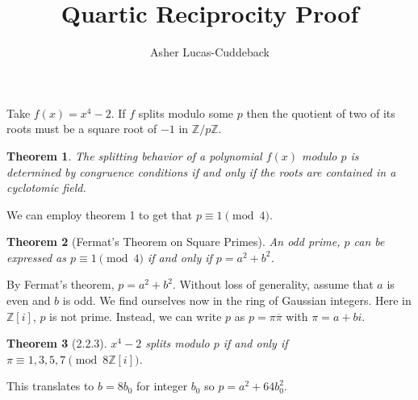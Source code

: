 \documentclass{tufte-handout}
\title{Quartic Reciprocity Proof}
\author[Asher]{Asher Lucas-Cuddeback}
\newtheorem{thm}{Theorem}
\begin{document}
\maketitle%

Take \(f(x)=x^4-2\). If \(f\) splits modulo some \(p\) then the quotient of two of its roots
must be a square root of \(-1\) in \(\mathbb{Z}/p\mathbb{Z}\). 

\begin{thm}
  The splitting behavior of a polynomial \(f(x)\) modulo \(p\) is determined by congruence 
  conditions if and only if the roots are contained in a cyclotomic field.
\end{thm}

We can employ theorem 1 to get that \(p\equiv 1 \pmod{4}\). 


\begin{thm}[Fermat's Theorem on Square Primes]
  An odd prime, \(p\) can be expressed as \(p\equiv 1\pmod{4}\) if and only if
  \(p=a^2+b^2\).
\end{thm}

By Fermat's theorem, \(p=a^2+b^2\). Without loss of generality, assume that \(a\) is even and
\(b\) is odd. We find ourselves now in the ring of Gaussian integers. Here in \(\mathbb{Z}[i]\),
\(p\) is not prime. Instead, we can write \(p\) as \(p=\pi\overline{\pi}\) with \(\pi=a+bi\). 

\begin{thm}[2.2.3]
  \(x^4-2\) splits modulo \(p\) if and only if \(\pi\equiv 1,3,5,7 \pmod{8\mathbb{Z}[i]}\).
\end{thm}
This translates to \(b=8b_0\) for integer \(b_0\) so \(p=a^2+64b_0^2\).
\end{document}
